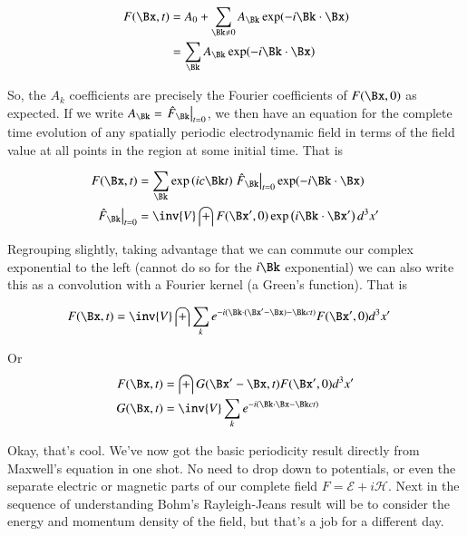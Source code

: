 \documentclass{article}
\newcommand{\EE}[0]{\boldsymbol{\mathcal{E}}}
\newcommand{\HH}[0]{\boldsymbol{\mathcal{H}}}
\begin{document}
\begin{align*}
F(\Bx,t) 
&= A_0 + \sum_{\Bk \ne 0} A_{\Bk} \exp(-i \Bk \cdot \Bx ) \\
&= \sum_{\Bk} A_{\Bk} \exp(-i \Bk \cdot \Bx ) \\
\end{align*}

So, the $A_k$ coefficients are precisely the Fourier coefficients of $F(\Bx,0)$ as expected.  If we write 
$
A_{\Bk}
=
{\left.\hat{F}_{\Bk}\right\vert}_{t=0}
$, we then have an equation for the complete time evolution of any spatially periodic electrodynamic field in terms of the field value at all points in the region at some initial time.  That is

\begin{align}
F(\Bx,t) &= \sum_{\Bk} \exp\left(i c \Bk t \right) {\left.\hat{F}_{\Bk}\right\vert}_{t=0} \exp(-i \Bk \cdot \Bx) \\
{\left.\hat{F}_{\Bk}\right\vert}_{t=0} &= \inv{V} \int F(\Bx', 0) \exp\left( i\Bk \cdot \Bx' \right) d^3 x'
\end{align}

Regrouping slightly, taking advantage that we can commute our complex exponential to the left (cannot do so for the $i\Bk$ exponential)
we can also write this as a convolution with a Fourier kernel (a Green's function).  That is

\begin{align}
F(\Bx,t) &= \inv{V} \int \sum_k e^{ - i (\Bk \cdot (\Bx' - \Bx) - \Bk c t) } F(\Bx', 0) d^3 x'
\end{align}

Or
\begin{align}
F(\Bx,t) &= \int G(\Bx' - \Bx, t) F(\Bx', 0) d^3 x' \\
G(\Bx,t) &= \inv{V} \sum_k e^{ - i (\Bk \cdot \Bx - \Bk c t) }
\end{align}

Okay, that's cool.  We've now got the basic periodicity result directly from Maxwell's equation in one shot.  No need to drop down to
potentials, or even the separate electric or magnetic parts of our complete field $F = \EE + i \HH$.  Next in the sequence of understanding
Bohm's Rayleigh-Jeans result will be to consider the energy and momentum density of the field, but that's a job for a different day.



\end{document}
